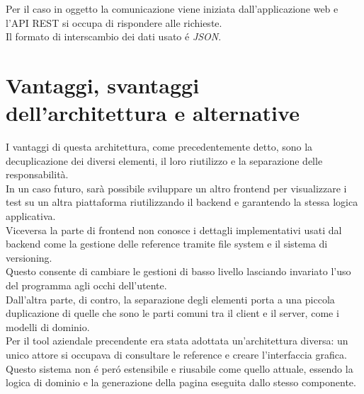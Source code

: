         Per il caso in oggetto la comunicazione viene iniziata dall'applicazione web e l'API REST si occupa di rispondere alle richieste.\\
        Il formato di interscambio dei dati usato \'e \textit{JSON}.

    \section{Vantaggi, svantaggi dell'architettura e alternative}
        I vantaggi di questa architettura, come precedentemente detto, sono la decuplicazione dei diversi elementi, il loro riutilizzo e la separazione delle responsabilità.\\
        
        In un caso futuro, sarà possibile sviluppare un altro frontend per visualizzare i test su un altra piattaforma riutilizzando il backend e garantendo la stessa logica applicativa.\\
        Viceversa la parte di frontend non conosce i dettagli implementativi usati dal backend come la gestione delle reference tramite file system e il sistema di versioning.\\
        Questo consente di cambiare le gestioni di basso livello lasciando invariato l'uso del programma agli occhi dell'utente.\\  
        
        Dall'altra parte, di contro, la separazione degli elementi porta a una piccola duplicazione di quelle che sono le parti comuni tra il client e il server, come i modelli di dominio.\\
        Per il tool aziendale precendente era stata adottata un'architettura diversa: un unico attore si occupava di consultare le reference e creare l'interfaccia grafica. \\
        Questo sistema non \'e per\'o estensibile e riusabile come quello attuale, essendo la logica di dominio e la generazione della pagina eseguita dallo stesso componente.
